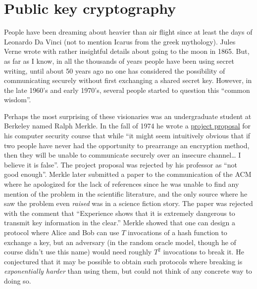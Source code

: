 \chapter{Public key cryptography}\label{Public-key-cryptography}

People have been dreaming about heavier than air flight since at least
the days of Leonardo Da Vinci (not to mention Icarus from the greek
mythology). Jules Verne wrote with rather insightful details about going
to the moon in 1865. But, as far as I know, in all the thousands of
years people have been using secret writing, until about 50 years ago no
one has considered the possibility of communicating securely without
first exchanging a shared secret key. However, in the late 1960's and
early 1970's, several people started to question this ``common wisdom''.

Perhaps the most surprising of these visionaries was an undergraduate
student at Berkeley named Ralph Merkle. In the fall of 1974 he wrote a
\href{http://www.merkle.com/1974/}{project proposal} for his computer
security course that while ``it might seem intuitively obvious that if
two people have never had the opportunity to prearrange an encryption
method, then they will be unable to communicate securely over an
insecure channel\ldots{} I believe it is false''. The project proposal
was rejected by his professor as ``not good enough''. Merkle later
submitted a paper to the communication of the ACM where he apologized
for the lack of references since he was unable to find any mention of
the problem in the scientific literature, and the only source where he
saw the problem even \emph{raised} was in a science fiction story. The
paper was rejected with the comment that ``Experience shows that it is
extremely dangerous to transmit key information in the clear.'' Merkle
showed that one can design a protocol where Alice and Bob can use \(T\)
invocations of a hash function to exchange a key, but an adversary (in
the random oracle model, though he of course didn't use this name) would
need roughly \(T^2\) invocations to break it. He conjectured that it may
be possible to obtain such protocols where breaking is
\emph{exponentially harder} than using them, but could not think of any
concrete way to doing so.

